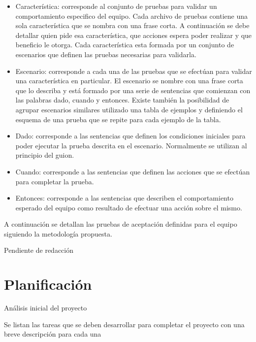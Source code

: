 \begin{itemize}
	\item Característica: corresponde al conjunto de pruebas para validar un comportamiento especifico del equipo. Cada archivo de pruebas contiene una sola característica que se nombra con una frase corta. A continuación se debe detallar quien pide esa característica, que acciones espera poder realizar y que beneficio le otorga. Cada característica esta formada por un conjunto de escenarios que definen las pruebas necesarias para validarla. 
	\item Escenario: corresponde a cada una de las pruebas que se efectúan para validar una característica en particular. El escenario se nombre con una frase corta que lo describa y está formado por una serie de sentencias que comienzan con las palabras dado, cuando y entonces. Existe también la posibilidad de agrupar escenarios similares utilizado una tabla de ejemplos y definiendo el esquema de una prueba que se repite para cada ejemplo de la tabla.
	\item Dado: corresponde a las sentencias que definen los condiciones iniciales para poder ejecutar la prueba descrita en el escenario. Normalmente se utilizan al principio del guion.
	\item Cuando: corresponde a las sentencias que definen las acciones que se efectúan para completar la prueba.
	\item Entonces: corresponde a las sentencias que describen el comportamiento esperado del equipo como resultado de efectuar una acción sobre el mismo.
\end{itemize}

A continuación se detallan las pruebas de aceptación definidas para el equipo siguiendo la metodología propuesta.



\begin{center}
	{\Large\color{red} Pendiente de redacción}
\end{center}

\section{Planificación}

Análisis inicial del proyecto

Se listan las tareas que se deben desarrollar para completar el proyecto con una breve descripción para cada una

